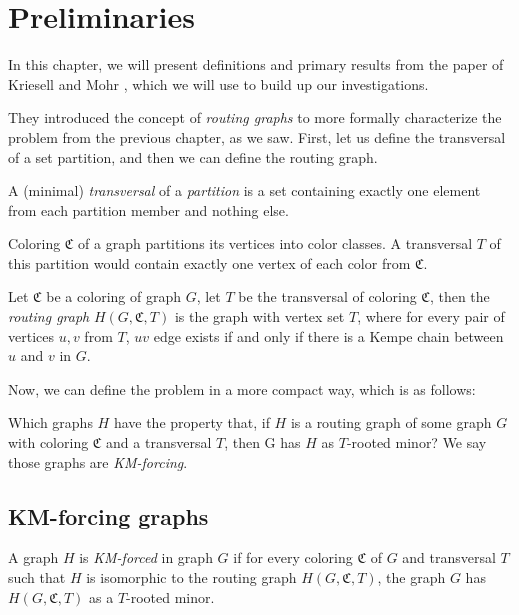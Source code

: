 \chapter{Preliminaries}
\label{chap:background}

In this chapter, we will present definitions and primary results from the paper of 
Kriesell and Mohr \cite{matthias_2022}, which we will use to build up our investigations.

They introduced the concept of \textit{routing graphs} to more formally characterize the problem from the previous chapter, as we saw. 
First, let us define the transversal of a set partition, and then we can define the routing graph.

\begin{defn}
 A (minimal) \emph{transversal} of a \emph{partition} is a set containing exactly one
 element from each partition member and nothing else.
\end{defn}

\begin{example}
 Coloring $\mathfrak{C}$ of a graph partitions its vertices into color classes. 
 A transversal $T$ of this partition would contain exactly one vertex of each color from $\mathfrak{C}$.
\end{example}

\begin{defn}
Let $\mathfrak{C}$ be a coloring of graph $G$, let $T$ be the transversal of coloring $\mathfrak{C}$, 
then the \emph{routing graph} $H(G, \mathfrak{C}, T)$ is the graph with vertex set $T$,
where for every pair of vertices $u,v$ from $T$, $uv$ edge exists if and only if
there is a Kempe chain between $u$ and $v$ in $G$.
\end{defn}

Now, we can define the problem in a more compact way, which is as follows:

Which graphs $H$ have the property that, if $H$ is a
routing graph of some graph $G$ with coloring $\mathfrak{C}$ and a transversal $T$, then G
has $H$ as $T$-rooted minor? We say those graphs are \textit{KM-forcing}.

\section{KM-forcing graphs}

\begin{defn}[KM-forced]
    A graph $H$ is \emph{KM-forced} in graph $G$ if for every coloring $\mathfrak{C}$ of $G$ and transversal $T$ such that $H$ is isomorphic to the routing graph $H(G, \mathfrak{C}, T)$, the graph $G$ has $H(G, \mathfrak{C}, T)$ as a $T$-rooted minor.  
\end{defn}

